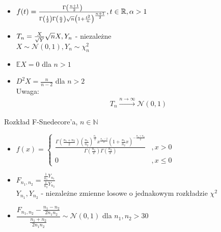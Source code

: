 \documentclass[a4paper,12pt]{report}
\theoremstyle{break}
\theoremstyle{definition}
\theoremstyle{defi}
\theoremstyle{break}
\theoremstyle{defi}
\begin{document}
\begin{multicols}{2}
\begin{itemize}
\item $ f(t)=
\frac{\Gamma\left(\frac{n+1}{2}\right)}{\Gamma\left(\frac{1}{2}\right)\Gamma\left(\frac{n}{2}\right)\sqrt n\left(1+\frac{t^2}{n}\right)^{\frac{n+1}{2}}},\\
t\in \mathbb R ,\alpha>1 $
\item $ T_n=\frac{X}{\sqrt Y}\sqrt n\\
X,Y_n $ - niezależne\\
$ X\sim\mathcal N(0,1),Y_n\sim \chi^2_n $
\item $ \mathbb E X=0 $ dla $ n>1 $
\item $ D^2X=\frac{n}{n-2} $ dla $ n>2 $\\
Uwaga:
\begin{gather*}
T_n\xrightarrow{n\to\infty }\mathcal N(0,1)
\end{gather*}
\end{itemize}
\end{multicols}
{\Large Rozkład F-Snedecore'a, $ n\in \mathbb N  $}
\begin{itemize}
\item $ f(x)=
\left \{
\begin{array}{ll}
\frac{\Gamma\left(\frac{n_1+n_2}{2}\right)\left(\frac{n_1}{n_2}\right)^{\frac{n_1}{2}}x^{\frac{n_1-2}{2}}\left(1+\frac{n_1}{n_2}x\right)^{-\frac{n_1+n_2}{2}}}{\Gamma\left(\frac{n_1}{2}\right)\Gamma\left(\frac{n_2}{2}\right)}&,x>0\\
0&,x\le0
\end{array}
\right . $
\item $ F_{n_1,n_2}=\frac{\frac{1}{n_1}Y_{n_1}}{\frac{1}{n_2}Y_{n_2}} $\\
$ Y_{n_1},Y_{n_2} $ - niezależne zmienne losowe o jednakowym rozkładzie $ \chi^2 $
\item $ \dfrac{F_{n_1,n_2}-\frac{n_1-n_2}{2n_1n_2}}{\frac{n_1+n_2}{2n_1n_2}}\sim\mathcal N(0,1) $ dla $ n_1,n_2>30 $
\end{itemize}
\end{document}

